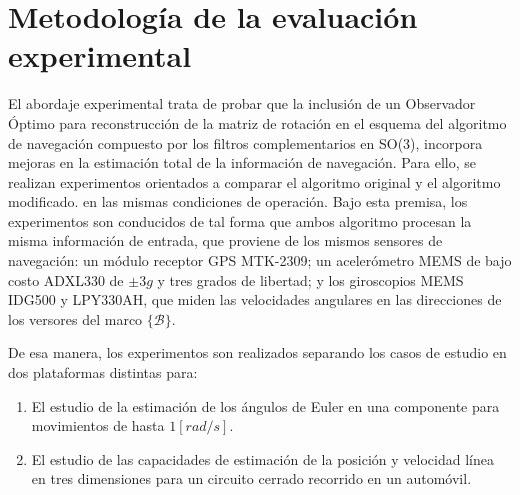 \documentclass[conference]{IEEEtran}
\newcommand{\marco}[1]{\{\mathcal{#1}\}}
\begin{document}
\section{Metodología de la evaluación experimental}\label{Metodologia}
El abordaje experimental trata de probar que la inclusión de un Observador Óptimo para reconstrucción de la matriz de rotación en el esquema del algoritmo de navegación compuesto por los filtros complementarios en SO(3), incorpora mejoras en la estimación total de la información de navegación. Para ello, se realizan experimentos orientados a comparar el algoritmo original y el algoritmo modificado. en las mismas condiciones de operación. Bajo esta premisa, los experimentos son conducidos de tal forma que ambos algoritmo procesan la misma información de entrada, que proviene de los mismos sensores de navegación: un módulo receptor GPS MTK-2309; un acelerómetro MEMS de bajo costo ADXL330 de $\pm3g$ y tres grados de libertad; y los giroscopios MEMS IDG500 y LPY330AH, que miden las velocidades angulares en las direcciones de los versores del marco $\marco{B}$. \par
De esa manera, los experimentos son realizados separando los casos de estudio en dos plataformas distintas para: 
\begin{enumerate}
\item El estudio de la estimación de los ángulos de Euler en una componente para movimientos de hasta $1[rad/s]$.
\item El estudio de las capacidades de estimación de la posición y velocidad línea en tres dimensiones para un circuito cerrado recorrido en un automóvil.
\end{enumerate}
\end{document}

